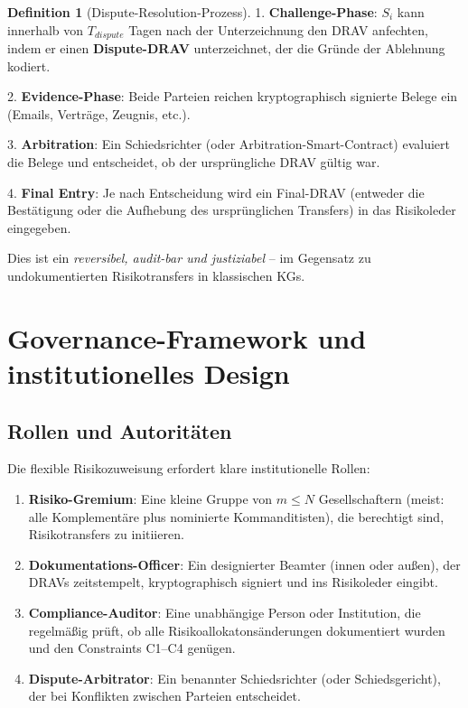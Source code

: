 \documentclass[a4paper, 12pt, twoside, openright]{report}
\theoremstyle{definition}
\newtheorem{definition}[theorem]{Definition}
\theoremstyle{definition}
\begin{document}
\begin{definition}[Dispute-Resolution-Prozess]
1. \textbf{Challenge-Phase}: $S_i$ kann innerhalb von $T_{dispute}$ Tagen nach der Unterzeichnung den DRAV anfechten, indem er einen \textbf{Dispute-DRAV} unterzeichnet, der die Gründe der Ablehnung kodiert.

2. \textbf{Evidence-Phase}: Beide Parteien reichen kryptographisch signierte Belege ein (Emails, Verträge, Zeugnis, etc.).

3. \textbf{Arbitration}: Ein Schiedsrichter (oder Arbitration-Smart-Contract) evaluiert die Belege und entscheidet, ob der ursprüngliche DRAV gültig war.

4. \textbf{Final Entry}: Je nach Entscheidung wird ein Final-DRAV (entweder die Bestätigung oder die Aufhebung des ursprünglichen Transfers) in das Risikoleder eingegeben.
\end{definition}

Dies ist ein \emph{reversibel, audit-bar und justiziabel} -- im Gegensatz zu undokumentierten Risikotransfers in klassischen KGs.

\section{Governance-Framework und institutionelles Design}

\subsection{Rollen und Autoritäten}

Die flexible Risikozuweisung erfordert klare institutionelle Rollen:

\begin{enumerate}
    \item \textbf{Risiko-Gremium}: Eine kleine Gruppe von $m \leq N$ Gesellschaftern (meist: alle Komplementäre plus nominierte Kommanditisten), die berechtigt sind, Risikotransfers zu initiieren.
    
    \item \textbf{Dokumentations-Officer}: Ein designierter Beamter (innen oder außen), der DRAVs zeitstempelt, kryptographisch signiert und ins Risikoleder eingibt.
    
    \item \textbf{Compliance-Auditor}: Eine unabhängige Person oder Institution, die regelmäßig prüft, ob alle Risikoallokatonsänderungen dokumentiert wurden und den Constraints C1--C4 genügen.
    
    \item \textbf{Dispute-Arbitrator}: Ein benannter Schiedsrichter (oder Schiedsgericht), der bei Konflikten zwischen Parteien entscheidet.
\end{enumerate}
\end{document}
